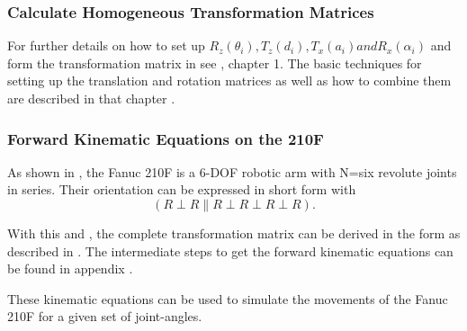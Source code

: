 \subsubsection{Calculate Homogeneous Transformation Matrices}

For further details on how to set up $R_z(\theta_i), T_z(d_i), T_x(a_i) and R_x(\alpha_i)$ and form the transformation matrix in   see %
\cite{Paul1981RobotM}, chapter 1. The basic techniques for setting up the translation and rotation matrices as well as how to combine them are described in that chapter .




\subsubsection{Forward Kinematic Equations on the 210F}
As shown in , the Fanuc 210F is a 6-\ac{DOF} robotic arm with \gls{N}=six revolute joints in series. 
Their orientation can be expressed in short form with 
\begin{equation}
(R\perp R\parallel R\perp R\perp R\perp R ) .
\end{equation}

With this and , the complete transformation matrix can be derived in the form as described in .
The intermediate steps to get the forward kinematic equations can be found in appendix .







These kinematic equations can be used to simulate the movements of the Fanuc 210F for a given set of joint-angles.



